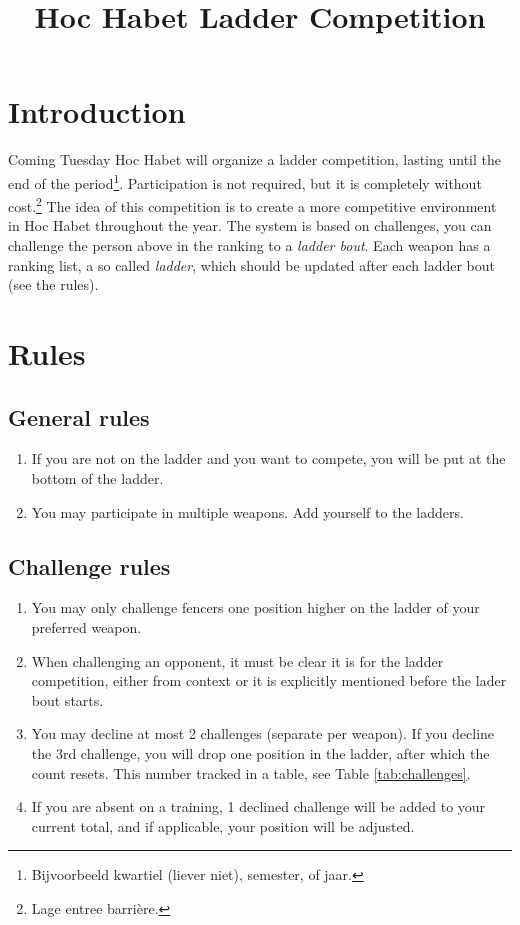 \documentclass{article}
\title{Hoc Habet Ladder Competition}
\author{}
\date{}
\begin{document}
\maketitle
\section{Introduction}
Coming Tuesday Hoc Habet will organize a ladder competition, lasting until the end of the period\footnote{Bijvoorbeeld kwartiel (liever niet), semester, of jaar.}. Participation is not required, but it is completely without cost.\footnote{Lage entree barrière.} The idea of this competition is to create a more competitive environment in Hoc Habet throughout the year. The system is based on challenges, you can challenge the person above in the ranking to a \emph{ladder bout}. Each weapon has a ranking list, a so called \emph{ladder}, which should be updated after each ladder bout (see the rules). 

\section{Rules}
\subsection{General rules}
\begin{enumerate}
    \item If you are not on the ladder and you want to compete, you will be put at the bottom of the ladder.
    \item You may participate in multiple weapons. Add yourself to the ladders.
\end{enumerate}
\subsection{Challenge rules}
\begin{enumerate}
   \item You may only challenge fencers one position higher on the ladder of your preferred weapon.
   \item When challenging an opponent, it must be clear it is for the ladder competition, either from context or it is explicitly mentioned before the lader bout starts.
   \item You may decline at most 2 challenges (separate per weapon). If you decline the 3rd challenge, you will drop one position in the ladder, after which the count resets. This number tracked in a table, see Table \ref{tab:challenges}.
   \item If you are absent on a training, 1 declined challenge will be added to your current total, and if applicable, your position will be adjusted.
\end{enumerate}
\end{document}
